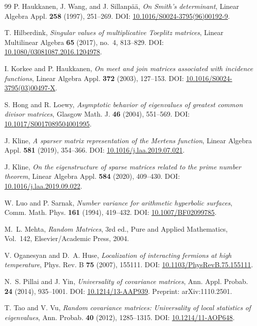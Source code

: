 \documentclass[11pt]{amsart}
\numberwithin{equation}{section}
\theoremstyle{plain}
\theoremstyle{definition}
\theoremstyle{remark}
\begin{document}
\begin{thebibliography}{99}
P. Haukkanen, J. Wang, and J. Sillanp\"a\"a,
\emph{On Smith's determinant},
Linear Algebra Appl. \textbf{258} (1997), 251--269.
DOI: \href{https://doi.org/10.1016/S0024-3795(96)00192-9}{10.1016/S0024-3795(96)00192-9}.

T. Hilberdink,
\emph{Singular values of multiplicative Toeplitz matrices},
Linear Multilinear Algebra \textbf{65} (2017), no.~4, 813--829.
DOI: \href{https://doi.org/10.1080/03081087.2016.1204978}{10.1080/03081087.2016.1204978}.

I. Korkee and P. Haukkanen,
\emph{On meet and join matrices associated with incidence functions},
Linear Algebra Appl. \textbf{372} (2003), 127--153.
DOI: \href{https://doi.org/10.1016/S0024-3795(03)00497-X}{10.1016/S0024-3795(03)00497-X}.

S. Hong and R. Loewy,
\emph{Asymptotic behavior of eigenvalues of greatest common divisor matrices},
Glasgow Math. J. \textbf{46} (2004), 551--569.
DOI: \href{https://doi.org/10.1017/S0017089504001995}{10.1017/S0017089504001995}.

J. Kline,
\emph{A sparser matrix representation of the Mertens function},
Linear Algebra Appl. \textbf{581} (2019), 354--366.
DOI: \href{https://doi.org/10.1016/j.laa.2019.07.021}{10.1016/j.laa.2019.07.021}.

J. Kline,
\emph{On the eigenstructure of sparse matrices related to the prime number theorem},
Linear Algebra Appl. \textbf{584} (2020), 409--430.
DOI: \href{https://doi.org/10.1016/j.laa.2019.09.022}{10.1016/j.laa.2019.09.022}.

W. Luo and P. Sarnak,
\emph{Number variance for arithmetic hyperbolic surfaces},
Comm. Math. Phys. \textbf{161} (1994), 419--432.
DOI: \href{https://doi.org/10.1007/BF02099785}{10.1007/BF02099785}.

M.~L. Mehta,
\emph{Random Matrices}, 3rd ed.,
Pure and Applied Mathematics, Vol.~142,
Elsevier/Academic Press, 2004.

V. Oganesyan and D.~A. Huse,
\emph{Localization of interacting fermions at high temperature},
Phys. Rev. B \textbf{75} (2007), 155111.
DOI: \href{https://doi.org/10.1103/PhysRevB.75.155111}{10.1103/PhysRevB.75.155111}.

N.~S. Pillai and J. Yin,
\emph{Universality of covariance matrices},
Ann. Appl. Probab. \textbf{24} (2014), 935--1001.
DOI: \href{https://doi.org/10.1214/13-AAP939}{10.1214/13-AAP939}.
Preprint: arXiv:1110.2501.

T. Tao and V. Vu,
\emph{Random covariance matrices: Universality of local statistics of eigenvalues},
Ann. Probab. \textbf{40} (2012), 1285--1315.
DOI: \href{https://doi.org/10.1214/11-AOP648}{10.1214/11-AOP648}.

\end{thebibliography}
\end{document}
